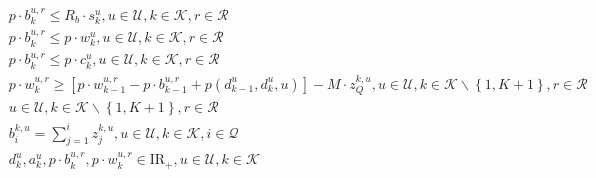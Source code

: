 \begin{align}
  & p \cdot b_{k}^{u , r} \leq R_{b} \cdot s_{k}^{u} , u \in \mathbf{\mathcal{U}} , k \in \mathbf{\mathcal{K}} , r \in \mathbf{\mathcal{R}} \tag{eq\_0037} \\
  & p \cdot b_{k}^{u , r} \leq p \cdot w_{k}^{u} , u \in \mathbf{\mathcal{U}} , k \in \mathbf{\mathcal{K}} , r \in \mathbf{\mathcal{R}} \tag{eq\_0038} \\
  & p \cdot b_{k}^{u , r} \leq p \cdot c_{k}^{u} , u \in \mathbf{\mathcal{U}} , k \in \mathbf{\mathcal{K}} , r \in \mathbf{\mathcal{R}} \tag{eq\_0039} \\
  & p \cdot w_{k}^{u , r} \geq \left[p \cdot w_{k - 1}^{u , r} - p \cdot b_{k - 1}^{u , r} + p \left(d_{k - 1}^{u} , d_{k}^{u} , u\right)\right] - M \cdot z_{Q}^{k , u} , u \in \mathbf{\mathcal{U}} , k \in \mathbf{\mathcal{K}} \backslash \left\{1 , K + 1\right\} , r \in \mathbf{\mathcal{R}} \tag{eq\_0041} \\
  & u \in \mathbf{\mathcal{U}} , k \in \mathbf{\mathcal{K}} \backslash \left\{1 , K + 1\right\} , r \in \mathbf{\mathcal{R}} \tag{eq\_0043\_a} \\
  & b_{i}^{k , u} = \sum_{j = 1}^{i} z_{j}^{k , u} , u \in \mathbf{\mathcal{U}} , k \in \mathbf{\mathcal{K}} , i \in \mathbf{\mathcal{Q}} \tag{eq\_0043\_b} \\
  & d_{k}^{u} , a_{k}^{u} , p \cdot b_{k}^{u , r} , p \cdot w_{k}^{u , r} \in \text{I} \text{R}_{+} , u \in \mathbf{\mathcal{U}} , k \in \mathbf{\mathcal{K}} \tag{eq\_0048} \\
\end{align}
